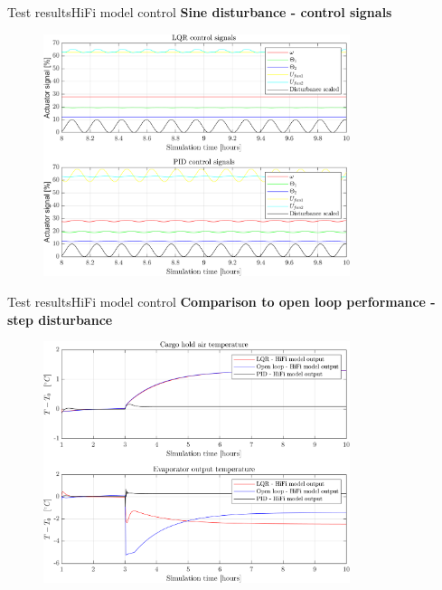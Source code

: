 \begin{frame}{Test results}{HiFi model control}
	\textbf{Sine disturbance - control signals}
	\begin{figure}[H]
		\centering
		\includegraphics[width=0.8\textwidth]{../Graphics/fig_inputs_sineDist_zoom.png}
	\end{figure}
\end{frame}


\begin{frame}{Test results}{HiFi model control}
	\textbf{Comparison to open loop performance - step disturbance}
	\begin{figure}[H]
		\centering
		\includegraphics[width=0.8\textwidth]{../Graphics/fig_LQRvsKresten_stepDist_OL_zoom.png}
	\end{figure} 
\end{frame}



